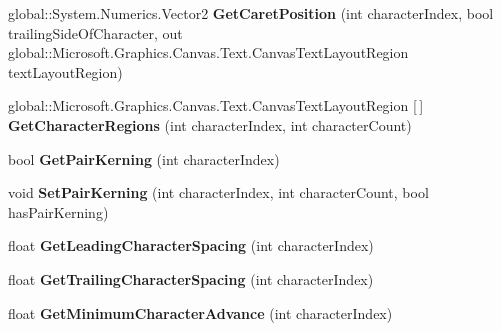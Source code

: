 \begin{DoxyCompactItemize}
global\+::\+System.\+Numerics.\+Vector2 {\bfseries Get\+Caret\+Position} (int character\+Index, bool trailing\+Side\+Of\+Character, out global\+::\+Microsoft.\+Graphics.\+Canvas.\+Text.\+Canvas\+Text\+Layout\+Region text\+Layout\+Region)
\item 
\mbox{\label{class_microsoft_1_1_graphics_1_1_canvas_1_1_text_1_1_canvas_text_layout_a7a2da41d929849793b28b02d8754c790}} 
global\+::\+Microsoft.\+Graphics.\+Canvas.\+Text.\+Canvas\+Text\+Layout\+Region \mbox{[}$\,$\mbox{]} {\bfseries Get\+Character\+Regions} (int character\+Index, int character\+Count)
\item 
\mbox{\label{class_microsoft_1_1_graphics_1_1_canvas_1_1_text_1_1_canvas_text_layout_add821cfda40c6e413e94792d52f961f5}} 
bool {\bfseries Get\+Pair\+Kerning} (int character\+Index)
\item 
\mbox{\label{class_microsoft_1_1_graphics_1_1_canvas_1_1_text_1_1_canvas_text_layout_ac079598c499d635ad51a5e304c41da93}} 
void {\bfseries Set\+Pair\+Kerning} (int character\+Index, int character\+Count, bool has\+Pair\+Kerning)
\item 
\mbox{\label{class_microsoft_1_1_graphics_1_1_canvas_1_1_text_1_1_canvas_text_layout_a65d05d925378e8e2514390271630066c}} 
float {\bfseries Get\+Leading\+Character\+Spacing} (int character\+Index)
\item 
\mbox{\label{class_microsoft_1_1_graphics_1_1_canvas_1_1_text_1_1_canvas_text_layout_a70acd1bd088fdd6ab75e719f500f7d5c}} 
float {\bfseries Get\+Trailing\+Character\+Spacing} (int character\+Index)
\item 
\mbox{\label{class_microsoft_1_1_graphics_1_1_canvas_1_1_text_1_1_canvas_text_layout_ae70042fca13d7c261dea65b89cbbae5d}} 
float {\bfseries Get\+Minimum\+Character\+Advance} (int character\+Index)
\item 
\mbox{\label{class_microsoft_1_1_graphics_1_1_canvas_1_1_text_1_1_canvas_text_layout_a738825e42cca183687361df02597990c}} 

\end{DoxyCompactItemize}
